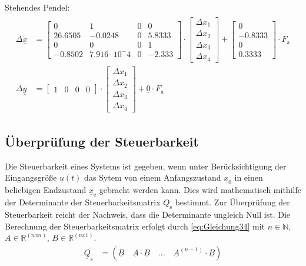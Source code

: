 \documentclass[
	pagesize,
	fontsize=12pt,
	paper=a4,
	oneside,
   reqno
]{scrartcl}
\begin{document}
Stehendes Pendel:
\begin{align}\label{eq:Gleichung33}
    \begin{split}
        \Delta{\dot{\underline{x}}}&=
        \begin{bmatrix}
            0 & 1 & 0 & 0 \\
            26.6505 & -0.0248 & 0 & 5.8333 \\
            0 & 0 & 0 & 1 \\
            -0.8502 & 7.916\cdot10^-4 & 0 & -2.333
        \end{bmatrix}\cdot
        \begin{bmatrix}
            \Delta{x_{\mathrm{1}}} \\ \Delta{x_{\mathrm{2}}} \\         \Delta{x_{\mathrm{3}}} \\ \Delta{x_{\mathrm{4}}}
        \end{bmatrix}+
        \begin{bmatrix}
            0 \\
            -0.8333 \\
            0 \\
            0.3333
        \end{bmatrix}\cdot F_{\mathrm{a}}
        \\
        \Delta{\underline{y}} &=
        \begin{bmatrix}
            1 & 0 & 0 & 0
        \end{bmatrix}\cdot
        \begin{bmatrix}
            \Delta{x_{\mathrm{1}}}\\
            \Delta{x_{\mathrm{2}}}\\
            \Delta{x_{\mathrm{3}}}\\
            \Delta{x_{\mathrm{4}}}
        \end{bmatrix}+\underline{0}\cdot F_{\mathrm{a}}
    \end{split}
\end{align}

\clearpage

\subsection{Überprüfung der Steuerbarkeit} \label{sec:Steuerbarkeit}
Die Steuerbarkeit eines Systems ist gegeben, wenn unter Berücksichtigung der Eingangsgröße $\underline{u}(t)$ das Sytem von einem Anfangszustand $\underline{x}_{\mathrm{0}}$ in einen beliebigen Endzustand $\underline{x}_{\mathrm{e}}$ gebracht werden kann. Dies wird mathematisch mithilfe der Determinante der Steuerbarkeitsmatrix $Q_{\mathrm{s}}$ bestimmt. Zur Überprüfung der Steuerbarkeit reicht der Nachweis, dass die Determinante ungleich Null ist. Die Berechnung der Steuerbarkeitsmatrix erfolgt durch \autoref{eq:Gleichung34} mit $n\in\mathbb{N}$, $A\in\mathbb{R}^{(nxn)}$, $B\in\mathbb{R}^{(nx1)}$.\\
\begin{align}\label{eq:Gleichung34}
    \underline{Q}_{\mathrm{s}} &= \left(\underline{B} \quad \underline{A}\cdot\underline{B} \quad ... \quad \underline{A}^{(n-1)}\cdot\underline{B}\right)
\end{align}
\end{document}
